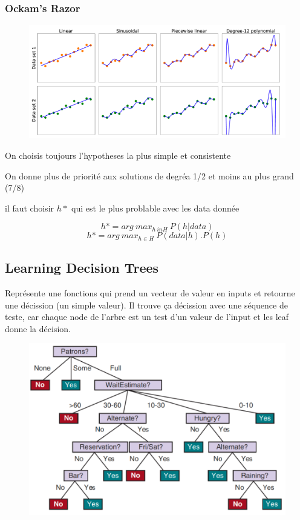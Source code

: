 \documentclass[12pt]{article}
\begin{document}
		\subsubsection{Ockam's Razor}
			\begin{figure}[H]
				\centering
				\includegraphics[width=\textwidth]{img/razor.png}
			\end{figure}
			
			On choisis toujours l'hypotheses la plus simple et consistente
			
			On donne plus de priorité aux solutions de degréa 1/2 et moins au plus grand (7/8)
			
			il faut choisir $h*$ qui est le plus problable avec les data donnée
			
			\begin{equation}
				h* = arg \ max_{h\ in H} \ P(h|data)
			\end{equation}
			\begin{equation}
				h* = arg \ max_{h \in H} \ P(data|h).P(h)
			\end{equation}
			
	\subsection{Learning Decision Trees}
		Représente une fonctions qui prend un vecteur de valeur en inputs et retourne une décission (un simple valeur). Il trouve ça décission avec une séquence de teste, car chaque node de l'arbre est un test d'un valeur de l'input et les leaf donne la décision.
		
		\begin{figure}[H]
			\centering
			\includegraphics[width=.8\textwidth]{img/tree.png}
		\end{figure}
		
\end{document}
